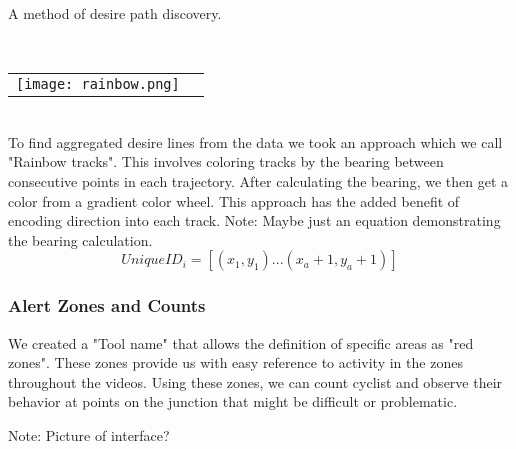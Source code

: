 A method of desire path discovery.

\ \\ 
\noindent
\begin{tabular}{@{}cc}
\texttt{[image: rainbow.png]} 
\end{tabular}
\label{Rainbow}
\ \\

To find aggregated desire lines from the data we took an approach which we call "Rainbow tracks". This involves coloring tracks by the bearing between consecutive points in each trajectory. After calculating the bearing, we then get a color from a gradient color wheel. This approach has the added benefit of encoding direction into 
each track.
Note: Maybe just an equation demonstrating the bearing calculation.
\ \\ 

\begin{equation}
  UniqueID_i = [(x_1, y_1)...(x_a+1, y_a+1)]\label{eq:3}
\end{equation}

\subsubsection{Alert Zones and Counts}

\color{red}
We created a "Tool name" that allows the definition of specific areas as "red zones". These zones provide us with easy reference to activity in the zones throughout the videos.
Using these zones, we can count cyclist and observe their behavior at points on the junction that might be difficult or
problematic.

Note: Picture of interface?
